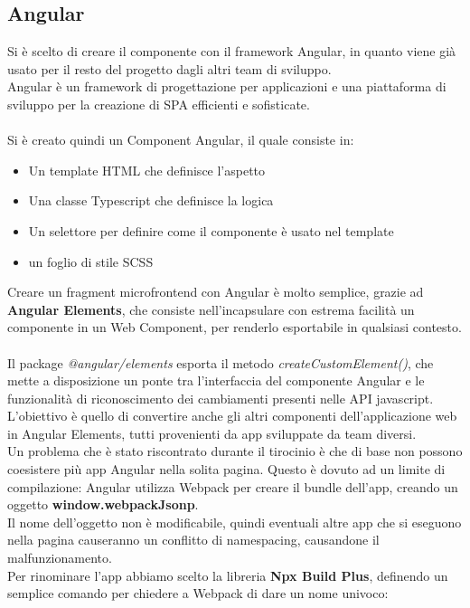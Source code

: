 \subsection{Angular}
Si è scelto di creare il componente con il framework Angular, in quanto viene già usato per 
il resto del progetto dagli altri team di sviluppo.
\\
Angular è un framework di progettazione per applicazioni e una piattaforma di sviluppo per la creazione 
di SPA efficienti e sofisticate. \cite{angular}
\\\\
Si è creato quindi un Component Angular, il quale consiste in:
\begin{itemize}
    \item Un template HTML che definisce l'aspetto
    \item Una classe Typescript che definisce la logica
    \item Un selettore per definire come il componente è usato nel template
    \item un foglio di stile SCSS
\end{itemize}
Creare un fragment microfrontend con Angular è molto semplice, grazie ad
\textbf{Angular Elements}, che consiste nell'incapsulare con estrema facilità un componente in un Web Component, per renderlo
esportabile in qualsiasi contesto.
\\\\
Il package \emph{@angular/elements} esporta il metodo \emph{createCustomElement()}, che mette a disposizione un ponte tra
l'interfaccia del componente Angular e le funzionalità di riconoscimento dei cambiamenti presenti nelle API javascript.
\\
L'obiettivo è quello di convertire anche gli altri componenti dell'applicazione web in Angular Elements, tutti provenienti da app
sviluppate da team diversi.\\
Un problema che è stato riscontrato durante il tirocinio è che di base non possono coesistere più app Angular nella solita pagina.
Questo è dovuto ad un limite di compilazione: Angular utilizza Webpack per creare il bundle dell'app, creando un oggetto \textbf{window.webpackJsonp}.
\\Il nome dell'oggetto non è modificabile, quindi eventuali altre app che si eseguono nella pagina causeranno un conflitto di namespacing, causandone
il malfunzionamento. \cite{webpackModifica}
\\
Per rinominare l'app abbiamo scelto la libreria \textbf{Npx Build Plus}, definendo un semplice comando per chiedere a Webpack di 
dare un nome univoco:

